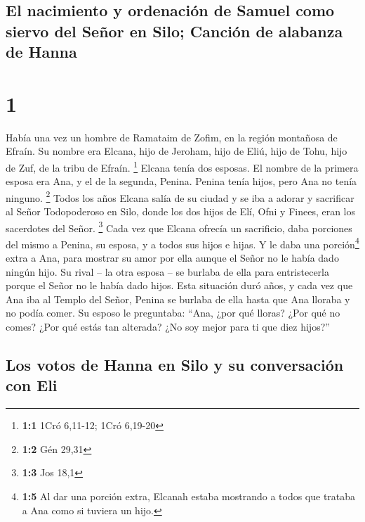 \hypertarget{el-nacimiento-y-ordenaciuxf3n-de-samuel-como-siervo-del-seuxf1or-en-silo-canciuxf3n-de-alabanza-de-hanna}{%
\subsection{El nacimiento y ordenación de Samuel como siervo del Señor
en Silo; Canción de alabanza de
Hanna}\label{el-nacimiento-y-ordenaciuxf3n-de-samuel-como-siervo-del-seuxf1or-en-silo-canciuxf3n-de-alabanza-de-hanna}}

\hypertarget{section}{%
\section{1}\label{section}}

 Había una vez un hombre de Ramataim de Zofim, en la
región montañosa de Efraín. Su nombre era Elcana, hijo de Jeroham, hijo
de Eliú, hijo de Tohu, hijo de Zuf, de la tribu de Efraín. \footnote{\textbf{1:1}
  1Cró 6,11-12; 1Cró 6,19-20}  Elcana tenía dos esposas.
El nombre de la primera esposa era Ana, y el de la segunda, Penina.
Penina tenía hijos, pero Ana no tenía ninguno. \footnote{\textbf{1:2}
  Gén 29,31}  Todos los años Elcana salía de su ciudad y
se iba a adorar y sacrificar al Señor Todopoderoso en Silo, donde los
dos hijos de Elí, Ofni y Finees, eran los sacerdotes del Señor.
\footnote{\textbf{1:3} Jos 18,1}  Cada vez que Elcana
ofrecía un sacrificio, daba porciones del mismo a Penina, su esposa, y a
todos sus hijos e hijas.  Y le daba una porción\footnote{\textbf{1:5}
  Al dar una porción extra, Elcanah estaba mostrando a todos que trataba
  a Ana como si tuviera un hijo.} extra a Ana, para mostrar su amor por
ella aunque el Señor no le había dado ningún hijo.  Su
rival -- la otra esposa -- se burlaba de ella para entristecerla porque
el Señor no le había dado hijos.  Esta situación duró
años, y cada vez que Ana iba al Templo del Señor, Penina se burlaba de
ella hasta que Ana lloraba y no podía comer.  Su esposo le
preguntaba: ``Ana, ¿por qué lloras? ¿Por qué no comes? ¿Por qué estás
tan alterada? ¿No soy mejor para ti que diez hijos?''

\hypertarget{los-votos-de-hanna-en-silo-y-su-conversaciuxf3n-con-eli}{%
\subsection{Los votos de Hanna en Silo y su conversación con
Eli}\label{los-votos-de-hanna-en-silo-y-su-conversaciuxf3n-con-eli}}

